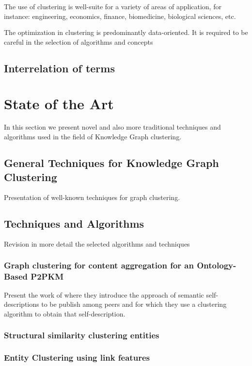 \documentclass[runningheads]{llncs}
\begin{document}
The use of clustering is well-suite for a variety of areas of application, for instance: engineering, economics, finance, biomedicine, biological sciences, etc. \cite{Pedrycz}

The optimization in clustering is predominantly data-oriented. \cite{Pedrycz}
It is required to be careful in the selection of algorithms and concepts 


\subsection{Interrelation of terms}


\section{State of the Art}
In this section we present novel and also more traditional techniques and algorithms used in the field of Knowledge Graph clustering. 


\subsection{General Techniques for Knowledge Graph Clustering}
Presentation of well-known techniques for graph clustering.


\subsection{Techniques and Algorithms}
Revision in more detail the selected algorithms and techniques 


\subsubsection{Graph clustering for content aggregation for an Ontology-Based P2PKM}
Present the work of \cite{Schmitz} where they introduce the approach of semantic self-descriptions to be publish among peers and for which they use a clustering algorithm to obtain that self-description.


\subsubsection{Structural similarity clustering entities}


\subsubsection{Entity Clustering using link features}
\end{document}
